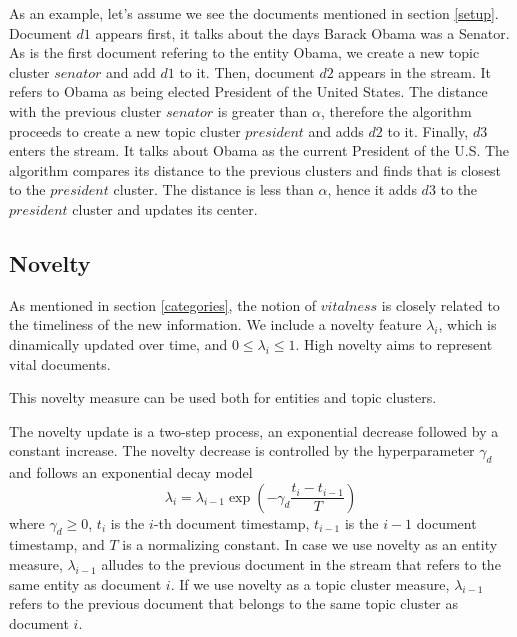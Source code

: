\documentclass{article}
\begin{document}
As an example, let's assume we see the documents mentioned in section \ref{setup}. Document $d1$ appears first, it talks about the days Barack Obama was a Senator. As is the first document refering to the entity Obama, we create a new topic cluster $senator$ and add $d1$ to it. Then, document $d2$ appears in the stream. It refers to Obama as being elected President of the United States. The distance with the previous cluster $senator$ is greater than $\alpha$, therefore the algorithm proceeds to create a new topic cluster $president$ and adds $d2$ to it. Finally, $d3$ enters the stream. It talks about Obama as the current President of the U.S. The algorithm compares its distance to the previous clusters and finds that is closest to the $president$ cluster. The distance is less than $\alpha$, hence it adds $d3$ to the $president$ cluster and updates its center.


\subsection{Novelty}
\label{novelty}

As mentioned in section \ref{categories}, the notion of $vitalness$ is closely related to the timeliness of the new information. We include a novelty feature $\lambda_i$, which is dinamically updated over time, and $0 \leq \lambda_i \leq 1$. High novelty aims to represent vital documents.

This novelty measure can be used both for entities and topic clusters.

The novelty update is a two-step process, an exponential decrease followed by a constant increase.
The novelty decrease is controlled by the hyperparameter $\gamma_d$ and follows an exponential decay model
\begin{equation}
\label{decrease}
\lambda_i = \lambda_{i-1} \exp{(-\gamma_d \frac{t_i-t_{i-1}}{T})}
\end{equation}
where $\gamma_d \geq 0$, $t_i$ is the $i$-th document timestamp, $t_{i-1}$ is the $i-1$ document timestamp, and $T$ is a normalizing constant.
In case we use novelty as an entity measure, $\lambda_{i-1}$ alludes to the previous document in the stream that refers to the same entity as document $i$.
If we use novelty as a topic cluster measure, $\lambda_{i-1}$ refers to the previous document that belongs to the same topic cluster as document $i$.
\end{document}
